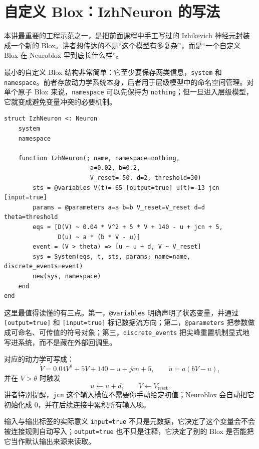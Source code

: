 \documentclass[a4paper]{article}
\begin{document}
\section{自定义 Blox：IzhNeuron 的写法}
本讲最重要的工程示范之一，是把前面课程中手工写过的 Izhikevich 神经元封装成一个新的 Blox。讲者想传达的不是“这个模型有多复杂”，而是“一个自定义 Blox 在 Neuroblox 里到底长什么样”。

最小的自定义 Blox 结构非常简单：它至少要保存两类信息，\texttt{system} 和 \texttt{namespace}。前者存放动力学系统本身，后者用于层级模型中的命名空间管理。对单个原子 Blox 来说，\texttt{namespace} 可以先保持为 \texttt{nothing}；但一旦进入层级模型，它就变成避免变量冲突的必要机制。

\begin{lstlisting}[caption={一个最小可用的 IzhNeuron 自定义 Blox}]
struct IzhNeuron <: Neuron
    system
    namespace

    function IzhNeuron(; name, namespace=nothing,
                        a=0.02, b=0.2,
                        V_reset=-50, d=2, threshold=30)
        sts = @variables V(t)=-65 [output=true] u(t)=-13 jcn [input=true]
        params = @parameters a=a b=b V_reset=V_reset d=d theta=threshold
        eqs = [D(V) ~ 0.04 * V^2 + 5 * V + 140 - u + jcn + 5,
               D(u) ~ a * (b * V - u)]
        event = (V > theta) => [u ~ u + d, V ~ V_reset]
        sys = System(eqs, t, sts, params; name=name, discrete_events=event)
        new(sys, namespace)
    end
end
\end{lstlisting}

这里最值得读懂的有三点。第一，\texttt{@variables} 明确声明了状态变量，并通过 \texttt{[output=true]} 和 \texttt{[input=true]} 标记数据流方向；第二，\texttt{@parameters} 把参数做成可命名、可传值的符号对象；第三，\texttt{discrete\_events} 把尖峰重置机制显式地写进系统，而不是藏在外部回调里。

对应的动力学可写成：
\[
\dot V = 0.04V^2 + 5V + 140 - u + jcn + 5,
\qquad
\dot u = a(bV - u),
\]
并在 \(V>\theta\) 时触发
\[
u \leftarrow u+d, \qquad V \leftarrow V_{\mathrm{reset}}.
\]
讲者特别提醒，\texttt{jcn} 这个输入槽位不需要你手动给定初值；Neuroblox 会自动把它初始化成 0，并在后续连接中累积所有输入项。

\begin{importantbox}{输入与输出标签的实际意义}
\texttt{input=true} 不只是元数据，它决定了这个变量会不会被连接规则自动写入；\texttt{output=true} 也不只是注释，它决定了别的 Blox 是否能把它当作默认输出来源来读取。
\end{importantbox}
\end{document}
